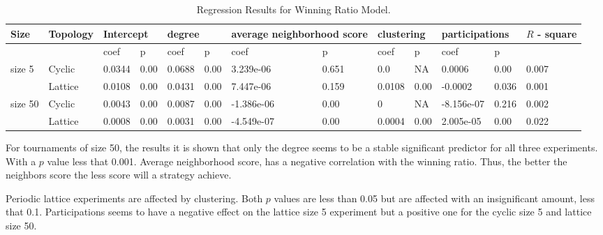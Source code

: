 \begin{table}[!hbtp]
\centering
\begin{adjustbox}{width=1\textwidth}
\small
\begin{tabular}{@{}|l|l|l|l|l|l|l|l|l|l|l|l|l|@{}}
\toprule
Size & Topology & \multicolumn{2}{l|}{Intercept} & \multicolumn{2}{l|}{degree} & \multicolumn{2}{l|}{average neighborhood score} & \multicolumn{2}{l|}{clustering} & \multicolumn{2}{l|}{participations} & \(R\) - square \\ \midrule
     &          & coef            & p            & coef          & p           & coef                      & p                    & coef             & p              & coef                & p             &          \\ \midrule
size 5  & Cyclic& 0.0344          & 0.00         & 0.0688        & 0.00        & 3.239e-06                 & 0.651                & 0.0              & NA             & 0.0006             & 0.00           & 0.007    \\ \midrule
     & Lattice  & 0.0108          & 0.00         & 0.0431        & 0.00        & 7.447e-06                 & 0.159                 & 0.0108           & 0.00           & -0.0002             & 0.036          & 0.001    \\ \midrule
size 50 & Cyclic& 0.0043          & 0.00         & 0.0087        & 0.00        & -1.386e-06                & 0.00                 & 0                & NA             & -8.156e-07          & 0.216          & 0.002    \\ \midrule
     & Lattice  & 0.0008          & 0.00         & 0.0031        & 0.00        & -4.549e-07                 & 0.00                 & 0.0004           & 0.00           & 2.005e-05          & 0.00          & 0.022    \\ \bottomrule
\end{tabular}
\end{adjustbox}
\caption{Regression Results for Winning Ratio Model.}
\label{regression-winning}
\end{table}

For tournaments of size 50, the results it is shown that only the degree seems
to be a stable significant predictor for all three experiments. With a \(p\)
value less that 0.001. Average neighborhood score, has a negative correlation
with the winning ratio. Thus, the
better the neighbors score the less score will a strategy achieve.

Periodic lattice experiments are affected by clustering. Both \(p\) values
are less than 0.05 but are affected with an insignificant amount, less that 0.1.
Participations seems to have a negative effect on the lattice size 5 experiment
but a positive one for the cyclic size 5 and lattice size 50.

